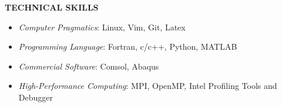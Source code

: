 \documentclass[12pt, letterpaper]{article}
\begin{document}
\textbf{TECHNICAL SKILLS}

\fullrule

\begin{itemize}[leftmargin=*, labelsep=3mm, itemsep=2pt, topsep=0pt]
   \item \textit{Computer Pragmatics}: Linux, Vim, Git, Latex
   \item \textit{Programming Language}: Fortran, c/c++, Python, MATLAB
   \item \textit{Commercial Software}: Comsol, Abaqus
   \item \textit{High-Performance Computing}: MPI, OpenMP, Intel Profiling Tools and Debugger
\end{itemize}
\end{document}
